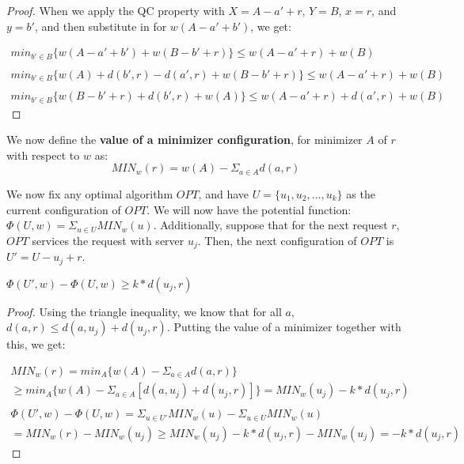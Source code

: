\begin{proof}
    When we apply the QC property with $X = A - a' + r$, $Y = B$, $x = r$, and $y = b'$, and then substitute in for $w(A - a' + b')$, we get:

    \begin{equation*}
        \begin{gathered}
            min_{b' \in B} \{ w(A - a' + b') + w(B - b' + r)\} \leq w(A - a' + r) + w(B) \\ \\
            min_{b' \in B} \{ w(A) + d(b', r) - d(a', r) + w(B - b' + r)\}\leq w(A - a' + r) + w(B) \\ \\
            min_{b' \in B} \{ w(B - b' + r) + d(b', r) + w(A)\} \leq w(A - a' + r) + d(a', r) + w(B)
        \end{gathered}
    \end{equation*}
\end{proof}

\begin{definition}
    \label{eq:MIN}
    We now define the \textbf{value of a minimizer configuration}, for minimizer $A$ of $r$ with respect to $w$ as: 
    \begin{equation*}
        MIN_w(r) = w(A) - \Sigma_{a \in A} d(a, r)
    \end{equation*}
\end{definition}

We now fix any optimal algorithm $OPT$, and have $U = \{u_1, u_2, ... , u_k \}$ as the current configuration of $OPT$. We will now have the potential function: $\Phi ( U, w) = \Sigma_{u \in U} MIN_w(u)$. Additionally, suppose that for the next request $r$, $OPT$ services the request with server $u_j$. Then, the next configuration of $OPT$ is $U' = U - u_j + r$.

\begin{lemma}
    \label{lem:ep1}
    $\Phi ( U', w) - \Phi (U, w) \geq k * d(u_j, r)$
\end{lemma}

\begin{proof}
    Using the triangle inequality, we know that for all $a$, $d(a, r) \leq d(a, u_j) + d(u_j, r)$. Putting the value of a minimizer together with this, we get:

    \begin{equation*}
        \begin{gathered}
            MIN_w(r) = min_A \{ w(A) - \Sigma_{a \in A} d(a, r)\} \\
            \geq min_A \{ w(A) - \Sigma_{a \in A} [d(a, u_j) + d(u_j, r)]\} = MIN_w(u_j) - k*d(u_j, r) \\ \\
            \Phi ( U', w) - \Phi (U, w) = \Sigma_{u \in U'} MIN_w(u) - \Sigma_{u \in U} MIN_w(u) \\ = MIN_w(r) - MIN_w(u_j) \geq MIN_w(u_j) - k * d(u_j, r) - MIN_w(u_j) = -k*d(u_j, r)
        \end{gathered}
    \end{equation*}
\end{proof}

